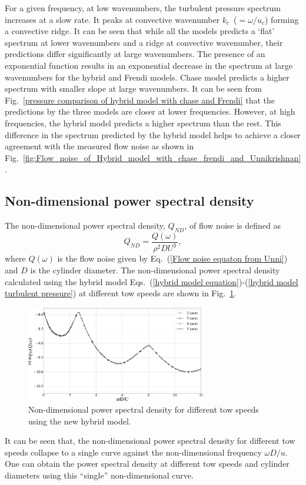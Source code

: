 \documentclass[twocolumn,10pt]{asme2ej}
\begin{document}
For a given frequency, at low wavenumbers, the turbulent pressure spectrum increases at a slow rate. It peaks at convective wavenumber $k_c$~($=\omega/u_c$) forming a convective ridge. It can be seen that while all the models predicts a `flat' spectrum at lower wavenumbers and a ridge at convective wavenumber, their predictions differ significantly at large wavenumbers. The presence of an exponential function results in an exponential decrease in the spectrum at large wavenumbers for the hybrid and Frendi models. Chase model predicts a higher spectrum with smaller slope at large wavenumbers. It can be seen from Fig.~\ref{pressure comparison of hybrid model with chase and Frendi} that the predictions by the three models are closer at lower frequencies. However, at high frequencies, the hybrid model predicts a higher spectrum than the rest. This difference in the spectrum predicted by the hybrid model helps to achieve a closer agreement with the measured flow noise as shown in Fig.~\ref{fig:Flow_noise_of_Hybrid_model_with_chase_frendi_and_Unnikrishnan}.

\subsection{Non-dimensional power spectral density}
The non-dimensional power spectral density, $Q_{ND}$, of flow noise is defined as
\begin{equation}
    Q_{ND} = \frac{Q(\omega)}{\rho^2 D U^3},
\end{equation}
where $Q(\omega)$ is the flow noise given by Eq.~(\ref{Flow noise equaton from Unni}) and $D$ is the cylinder diameter. The non-dimensional power spectral density calculated using the hybrid model Eqs.~(\ref{hybrid model equation})-(\ref{hybrid model turbulent pressure}) at different tow speeds are shown in Fig.~\ref{non dimensional plot of hybrid model}.
\begin{figure}[h]
    \centering
    \includegraphics[width=3.1in]{figure/Non_dimensional_plot_of_hybrid_model.eps}
    \caption{Non-dimensional power spectral density for different tow speeds using the new hybrid model.}
    \label{non dimensional plot of hybrid model}
\end{figure}
It can be seen that, the non-dimensional power spectral density for different tow speeds collapse to a single curve against the non-dimensional frequency $\omega D/u$. One can obtain the power spectral density at different tow speeds and cylinder diameters using this \enquote{single} non-dimensional curve.
\end{document}
